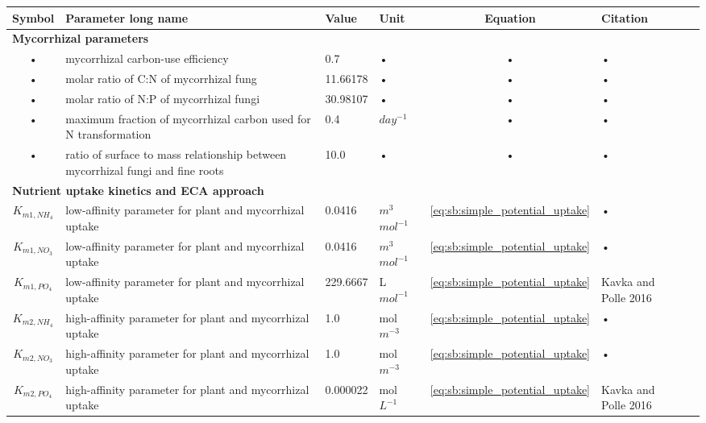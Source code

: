 \documentclass[11pt,oneside,openright,a4paper,fleqn]{book}  %
\begin{document}
\begin{table}
\begin{tabularx}{\linewidth}{|c|X|l|l|c|l|c|} %
\hline 
Symbol & Parameter long name & Value & Unit & Equation & Citation \\
\hline 

\multicolumn{6}{l}{\bf Mycorrhizal parameters}\\
\hline
• & mycorrhizal carbon-use efficiency & 0.7 & • & • & • \\
• & molar ratio of C:N of mycorrhizal fung & 11.66178 & • & • & • \\
• & molar ratio of N:P of mycorrhizal fungi & 30.98107 & • & • & • \\
• & maximum fraction of mycorrhizal carbon used for N transformation & 0.4 & $day^{-1}$ & • & • \\
• & ratio of surface to mass relationship between mycorrhizal fungi and fine roots & 10.0 & • & • & • \\
\hline 

\multicolumn{6}{l}{\bf Nutrient uptake kinetics and ECA approach}\\
\hline
$K_{m1,NH_4}$ & low-affinity parameter for plant and mycorrhizal uptake & 0.0416 & $m^3$ $mol^{-1}$ & \ref{eq:sb:simple_potential_uptake} & • \\
$K_{m1,NO_3}$ & low-affinity parameter for plant and mycorrhizal uptake & 0.0416 & $m^3$ $mol^{-1}$ & \ref{eq:sb:simple_potential_uptake} & • \\
$K_{m1,PO_4}$ & low-affinity parameter for plant and mycorrhizal uptake & 229.6667 & L $mol^{-1}$ & \ref{eq:sb:simple_potential_uptake} & Kavka and Polle 2016 \\
$K_{m2,NH_4}$ & high-affinity parameter for plant and mycorrhizal uptake & 1.0 & mol $m^{-3}$ & \ref{eq:sb:simple_potential_uptake} & • \\
$K_{m2,NO_3}$ & high-affinity parameter for plant and mycorrhizal uptake & 1.0 & mol $m^{-3}$ & \ref{eq:sb:simple_potential_uptake} & • \\
$K_{m2,PO_4}$ & high-affinity parameter for plant and mycorrhizal uptake & 0.000022 & mol $L^{-1}$ & \ref{eq:sb:simple_potential_uptake} & Kavka and Polle 2016 \\

\hline 
\end{tabularx}
\end{table}
\end{document}
